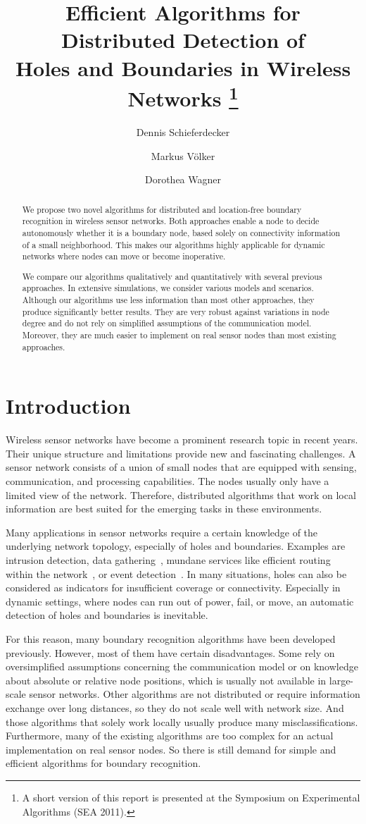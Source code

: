 \documentclass{llncs}
\title{Efficient Algorithms for Distributed Detection of \\ Holes and Boundaries in Wireless Networks
\thanks{A short version of this report is presented at the  Symposium on Experimental Algorithms (SEA 2011).}
}
\author{Dennis Schieferdecker \and Markus V\"olker \and Dorothea Wagner}
\institute{Karlsruhe Institute of Technology (KIT), Germany \\ \email{\{schieferdecker,m.voelker,dorothea.wagner\}@kit.edu}}
\begin{document}
\maketitle
\begin{abstract}
We propose two novel algorithms for distributed and location-free boundary recognition in wireless sensor networks.
Both approaches enable a node to decide autonomously whether it is a boundary node, based solely on connectivity information of a small neighborhood.
This makes our algorithms highly applicable for dynamic networks where nodes can move or become inoperative.

We compare our algorithms qualitatively and quantitatively with several previous approaches.
In extensive simulations, we consider various models and scenarios.
Although our algorithms use less information than most other approaches, they produce significantly better results.
They are very robust against variations in node degree and do not rely on simplified assumptions of the communication model.
Moreover, they are much easier to implement on real sensor nodes than most existing approaches.
\end{abstract}




\section{Introduction}
Wireless sensor networks have become a prominent research topic in recent years.
Their unique structure and limitations provide new and fascinating challenges.
A sensor network consists of a union of small nodes that are equipped with sensing, communication, and processing capabilities.
The nodes usually only have a limited view of the network. 
Therefore, distributed algorithms that work on local information are best suited for the emerging tasks in these environments.

Many applications in sensor networks require a certain knowledge of the underlying network topology, especially of holes and boundaries.
Examples are intrusion detection, data gathering~\cite{wgm06}, mundane services like efficient routing within the network~\cite{fgg04,rao03}, or event detection~\cite{dll09}.
In many situations, holes can also be considered as indicators for insufficient coverage or connectivity.
Especially in dynamic settings, where nodes can run out of power, fail, or move, an automatic detection of holes and boundaries is inevitable.

For this reason, many boundary recognition algorithms have been developed previously.
However, most of them have certain disadvantages.
Some rely on oversimplified assumptions concerning the communication model or on knowledge about absolute or relative node positions, which is usually not available in large-scale sensor networks.
Other algorithms are not distributed or require information exchange over long distances, so they do not scale well with network size.
And those algorithms that solely work locally usually produce many misclassifications.
Furthermore, many of the existing algorithms are too complex for an actual implementation on real sensor nodes.
So there is still demand for simple and efficient algorithms for boundary recognition.
\end{document}
